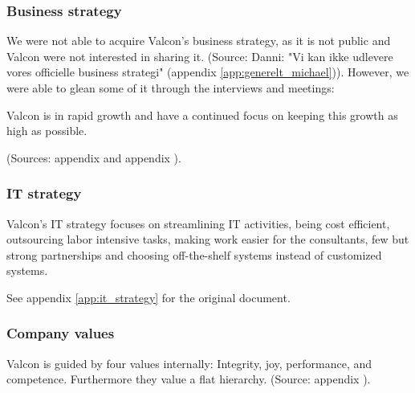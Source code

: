 \subsubsection{Business strategy}
We were not able to acquire Valcon's business strategy, as it is not public and Valcon were not interested in sharing it. (Source: Danni: "Vi kan ikke udlevere vores officielle business strategi" (appendix \ref{app:generelt_michael})). 
However, we were able to glean some of it through the interviews and meetings:

Valcon is in rapid growth and have a continued focus on keeping this growth as high as possible. 

(Sources: appendix  and appendix ).

\subsubsection{IT strategy}
Valcon's IT strategy focuses on streamlining IT activities, being cost efficient, outsourcing labor intensive tasks, making work easier for the consultants, few but strong partnerships and choosing off-the-shelf systems instead of customized systems.

See appendix \ref{app:it_strategy} for the original document.

\subsubsection{Company values}
Valcon is guided by four values internally: Integrity, joy, performance, and competence.
Furthermore they value a flat hierarchy.
(Source: appendix ).